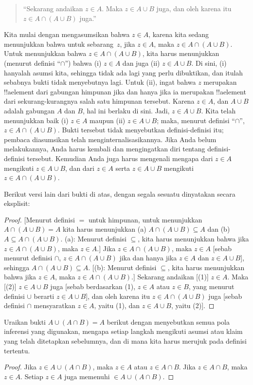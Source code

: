 \documentclass[../../../include/open-logic-section]{subfiles}
\begin{document}
\begin{quote}
``Sekarang andaikan $z \in A$. Maka $z \in A \cup B$ juga, dan oleh
karena itu $z \in A \cap (A \cup B)$ juga.''
\end{quote}

Kita mulai dengan mengasumsikan bahwa $z \in A$, karena kita sedang
menunjukkan bahwa untuk sebarang~$z$, jika $z \in A$, maka $z \in A
\cap (A \cup B)$. Untuk menunjukkan bahwa $z \in A \cap (A \cup B)$,
kita harus menunjukkan (menurut definisi ``$\cap$'') bahwa (i) $z \in
A$ dan juga (ii) $z \in A \cup B$. Di sini, (i) hanyalah asumsi kita,
sehingga tidak ada lagi yang perlu dibuktikan, dan itulah sebabnya
bukti tidak menyebutnya lagi. Untuk (ii), ingat bahwa $z$ merupakan
!!a{element} dari gabungan himpunan jika dan hanya jika ia merupakan
!!a{element} dari sekurang-kurangnya salah satu himpunan tersebut.
Karena $z \in A$, dan $A \cup B$ adalah gabungan $A$ dan $B$, hal ini
berlaku di sini. Jadi, $z \in A \cup B$. Kita telah menunjukkan baik
(i) $z \in A$ maupun (ii) $z \in A \cup B$; maka, menurut definisi
``$\cap$'', $z \in A \cap (A \cup B)$. Bukti tersebut tidak
menyebutkan definisi-definisi itu; pembaca diasumsikan telah
menginternalisasikannya. Jika Anda belum melakukannya, Anda harus
kembali dan mengingatkan diri tentang definisi-definisi tersebut.
Kemudian Anda juga harus mengenali mengapa dari $z \in A$ mengikuti $z
\in A \cup B$, dan dari $z \in A$ serta $z \in A \cup B$ mengikuti
$z \in A \cap (A \cup B)$.

Berikut versi lain dari bukti di atas, dengan segala sesuatu dinyatakan
secara eksplisit:
\begin{proof}{}
[Menurut definisi $=$ untuk himpunan, untuk menunjukkan $A \cap (A
  \cup B) = A$ kita harus menunjukkan (a) $A \cap (A \cup B)
  \subseteq A$ dan (b) $A \subseteq A \cap (A \cup B)$. (a): Menurut
  definisi $\subseteq$, kita harus menunjukkan bahwa jika $z \in A
  \cap (A \cup B)$, maka $z \in A$.] Jika $z \in A \cap (A \cup B)$,
maka $z \in A$ [sebab menurut definisi $\cap$, $z \in A \cap (A \cup
B)$ jika dan hanya jika $z \in A$ dan $z \in A \cup B$], sehingga $A
\cap (A \cup B) \subseteq A$. [(b): Menurut definisi $\subseteq$, kita
harus menunjukkan bahwa jika $z \in A$, maka $z \in A \cap (A \cup
B)$.] Sekarang andaikan [(1)] $z \in A$. Maka [(2)] $z \in A \cup B$
juga [sebab berdasarkan (1), $z \in A$ atau $z \in B$, yang menurut
definisi $\cup$ berarti $z \in A \cup B$], dan oleh karena itu $z \in
A \cap (A \cup B)$ juga [sebab definisi $\cap$ mensyaratkan $z \in A$,
yaitu (1), dan $z \in A \cup B$, yaitu (2)].
\end{proof}

\begin{prob}
Uraikan bukti $A \cup (A \cap B) = A$ berikut dengan menyebutkan semua
pola inferensi yang digunakan, mengapa setiap langkah mengikuti asumsi
atau klaim yang telah ditetapkan sebelumnya, dan di mana kita harus
merujuk pada definisi tertentu.
\begin{proof}
  Jika $z \in A \cup (A \cap B)$, maka $z \in A$ atau $z \in A \cap
  B$. Jika $z \in A \cap B$, maka $z \in A$. Setiap $z \in A$ juga
  memenuhi $\in A \cup (A \cap B)$.
\end{proof}
\end{prob}
\end{document}
